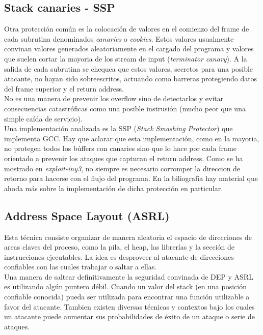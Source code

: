 \documentclass[12pt]{article}
\begin{document}
\subsection{Stack canaries - SSP}
Otra protección común es la colocación de valores en el comienzo del frame de cada subrutina denominados \textit{canaries} o \textit{cookies}. Estos valores usualmente convinan valores generados aleatoriamente en el cargado del programa y valores que suelen cortar la mayoria de los stream de input (\textit{terminator canary}). A la salida de cada subrutina se chequea que estos valores, secretos para una posible atacante, no hayan sido sobreescritos, actuando como barreras protegiendo datos del frame superior y el return address.\\

No es una manera de prevenir los overflow sino de detectarlos y evitar consecuencias catastróficas como una posible instrusión (mucho peor que una simple caída de servicio). \\

Una implementación analizada es la SSP (\textit{Stack Smashing Protector}) que implementa GCC. Hay que aclarar que esta implementación, como en la mayoria, no protegen todos los búffers con canaries sino que lo hace por cada frame orientado a prevenir los ataques que capturan el return address. Como se ha mostrado en \textit{exploit-iny3}, no siempre es necesario corromper la direccion de retorno para hacerse con el flujo del programa. En la biliografía hay material que ahoda más sobre la implementación de dicha protección en particular.


\subsection{Address Space Layout (ASRL)}
Esta técnica consiste organizar de manera aleatoria el espacio de direcciones de areas claves del proceso, como la pila, el heap, las librerías y la sección de instrucciones ejecutables. La idea es desproveer al atacante de direcciones confiables con las cuales trabajar o saltar a ellas. \\

Una manera de saltear definitivamente la seguridad convinada de DEP y ASRL es utilizando algún puntero débil. Cuando un valor del stack (en una posición confiable conocida) pueda ser utilizada para encontrar una función utilizable a favor del atacante. Tambien existen diversas técnicas y contextos bajo los cuales un atacante puede aumentar sus probabilidades de éxito de un ataque o serie de ataques.
\end{document}

